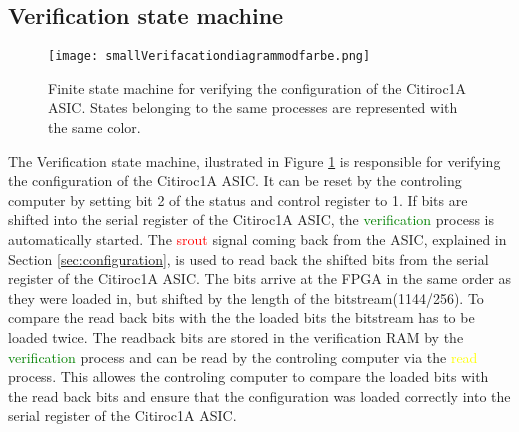 \subsection{Verification state machine}
\begin{figure}[H]
    \centering
    \texttt{[image: smallVerifacationdiagrammodfarbe.png]}%
    \caption{Finite state machine for verifying the configuration of the Citiroc1A ASIC.
    States belonging to the same processes are represented with the same color.}
    \label{fig:Verification_state_machine}
\end{figure}
The Verification state machine, ilustrated in Figure \ref{fig:Verification_state_machine} is responsible for verifying the configuration of the Citiroc1A ASIC.
\newline
It can be reset by the controling computer by setting bit 2 of the status and control register to 1.
\newline
If bits are shifted into the serial register of the Citiroc1A ASIC, the \textcolor{green}{verification} process is automatically started.
The \textcolor{red}{srout} signal coming back from the ASIC, explained in Section \ref{sec:configuration}, is used to read back the shifted bits from the serial register of the Citiroc1A ASIC.
The bits arrive at the FPGA in the same order as they were loaded in, but shifted by the length of the bitstream(1144/256). To compare the read back bits with the the loaded bits the bitstream has to be loaded twice.
\newline
The readback bits are stored in the verification RAM by the \textcolor{green}{verification} process and can be read by the controling computer via the  \textcolor{yellow}{read} process.
This allowes the controling computer to compare the loaded bits with the read back bits and ensure that the configuration was loaded correctly into the serial register of the Citiroc1A ASIC.
